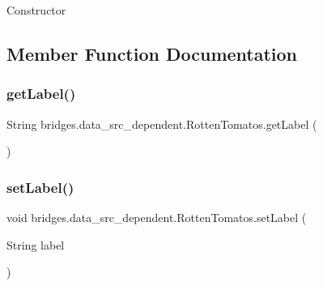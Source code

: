 Constructor 

\subsection{Member Function Documentation}
\hypertarget{classbridges_1_1data__src__dependent_1_1_rotten_tomatos_a64c1b0e15a8a0104d4da2a5e3f0f09f7}{}\label{classbridges_1_1data__src__dependent_1_1_rotten_tomatos_a64c1b0e15a8a0104d4da2a5e3f0f09f7} 
\subsubsection{\texorpdfstring{get\+Label()}{getLabel()}}
{\footnotesize\ttfamily String bridges.\+data\+\_\+src\+\_\+dependent.\+Rotten\+Tomatos.\+get\+Label (\begin{DoxyParamCaption}{ }\end{DoxyParamCaption})}

\hypertarget{classbridges_1_1data__src__dependent_1_1_rotten_tomatos_a7edb12a260f8f309ba45825eff44e8e7}{}\label{classbridges_1_1data__src__dependent_1_1_rotten_tomatos_a7edb12a260f8f309ba45825eff44e8e7} 
\subsubsection{\texorpdfstring{set\+Label()}{setLabel()}}
{\footnotesize\ttfamily void bridges.\+data\+\_\+src\+\_\+dependent.\+Rotten\+Tomatos.\+set\+Label (\begin{DoxyParamCaption}\item[{String}]{label }\end{DoxyParamCaption})}

\hypertarget{classbridges_1_1data__src__dependent_1_1_rotten_tomatos_ae417dd4acab340041d2d88b0fd828784}{}\label{classbridges_1_1data__src__dependent_1_1_rotten_tomatos_ae417dd4acab340041d2d88b0fd828784} 
